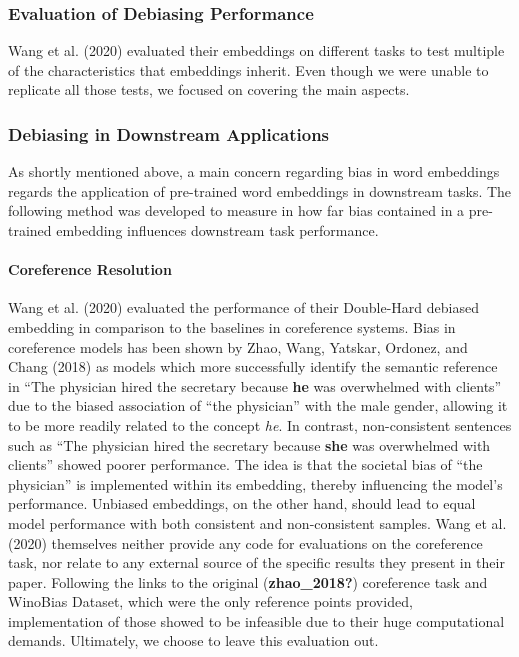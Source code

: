 \documentclass[
  english,
  man,floatsintext]{apa6}
\let\oldparagraph\paragraph
\renewcommand{\paragraph}[1]{\oldparagraph{#1}\mbox{}}
\begin{document}
\hypertarget{evaluation-of-debiasing-performance}{%
\subsubsection{Evaluation of Debiasing Performance}\label{evaluation-of-debiasing-performance}}

Wang et al. (2020) evaluated their embeddings on different tasks to test multiple of the characteristics that embeddings inherit. Even though we were unable to replicate all those tests, we focused on covering the main aspects.

\hypertarget{debiasing-in-downstream-applications}{%
\subsubsection{Debiasing in Downstream Applications}\label{debiasing-in-downstream-applications}}

As shortly mentioned above, a main concern regarding bias in word embeddings regards the application of pre-trained word embeddings in downstream tasks. The following method was developed to measure in how far bias contained in a pre-trained embedding influences downstream task performance.

\hypertarget{coreference-resolution}{%
\paragraph{Coreference Resolution}\label{coreference-resolution}}

Wang et al. (2020) evaluated the performance of their Double-Hard debiased embedding in comparison to the baselines in coreference systems. Bias in coreference models has been shown by Zhao, Wang, Yatskar, Ordonez, and Chang (2018) as models which more successfully identify the semantic reference in ``The physician hired the secretary because \textbf{he} was overwhelmed with clients'' due to the biased association of ``the physician'' with the male gender, allowing it to be more readily related to the concept \emph{he}. In contrast, non-consistent sentences such as ``The physician hired the secretary because \textbf{she} was overwhelmed with clients'' showed poorer performance. The idea is that the societal bias of ``the physician'' is implemented within its embedding, thereby influencing the model's performance. Unbiased embeddings, on the other hand, should lead to equal model performance with both consistent and non-consistent samples.
Wang et al. (2020) themselves neither provide any code for evaluations on the coreference task, nor relate to any external source of the specific results they present in their paper. Following the links to the original (\textbf{zhao\_2018?}) coreference task and WinoBias Dataset, which were the only reference points provided, implementation of those showed to be infeasible due to their huge computational demands. Ultimately, we choose to leave this evaluation out.
\end{document}
